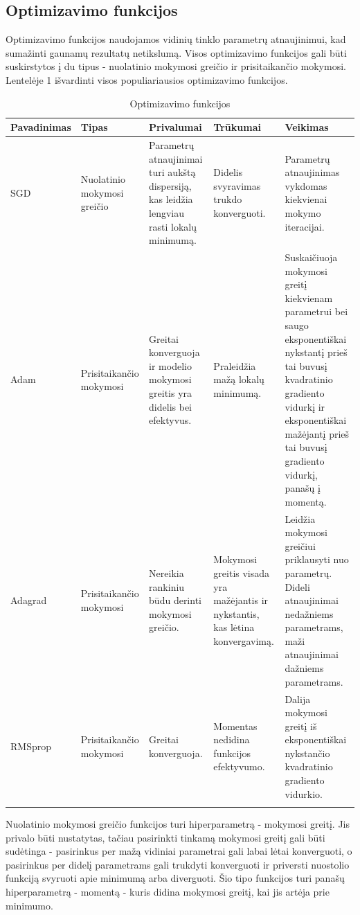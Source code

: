\documentclass{VUMIFPSkursinis}
\begin{document}
\subsection{Optimizavimo funkcijos}
Optimizavimo funkcijos naudojamos vidinių tinklo parametrų atnaujinimui, kad sumažinti gaunamų rezultatų netikslumą. 
Visos optimizavimo funkcijos gali būti suskirstytos į du tipus - nuolatinio mokymosi greičio ir prisitaikančio mokymosi. 
Lentelėje 1 išvardinti visos populiariausios optimizavimo funkcijos.

\begin{longtable}[h!]{ | p{2cm} | p{2.2cm} | p{2.5cm} | p{2.5cm} | p{4.5cm} | } 
\hline
Pavadinimas & Tipas & Privalumai & Trūkumai & Veikimas \\
\hline
SGD & Nuolatinio mokymosi greičio & Parametrų atnaujinimai turi aukštą dispersiją, kas leidžia lengviau rasti lokalų minimumą. & Didelis svyravimas trukdo konverguoti. & Parametrų atnaujinimas vykdomas kiekvienai mokymo iteracijai. \\
\hline
Adam & Prisitaikančio mokymosi & Greitai konverguoja ir modelio mokymosi greitis yra didelis bei efektyvus. & Praleidžia mažą lokalų minimumą. & Suskaičiuoja mokymosi greitį kiekvienam parametrui bei saugo eksponentiškai nykstantį prieš tai buvusį kvadratinio gradiento vidurkį ir eksponentiškai mažėjantį prieš tai buvusį gradiento vidurkį, panašų į momentą. \\
\hline
Adagrad & Prisitaikančio mokymosi & Nereikia rankiniu būdu derinti mokymosi greičio. & Mokymosi greitis visada yra mažėjantis ir nykstantis, kas lėtina konvergavimą. & Leidžia mokymosi greičiui priklausyti nuo parametrų. Dideli atnaujinimai nedažniems parametrams, maži atnaujinimai dažniems parametrams. \\
\hline
RMSprop & Prisitaikančio mokymosi & Greitai konverguoja. & Momentas nedidina funkcijos efektyvumo. & Dalija mokymosi greitį iš eksponentiškai nykstančio kvadratinio gradiento vidurkio. \\
\hline
\caption{Optimizavimo funkcijos}
\end{longtable}

Nuolatinio mokymosi greičio funkcijos turi hiperparametrą - mokymosi greitį. Jis privalo būti nustatytas, tačiau 
pasirinkti tinkamą mokymosi greitį gali būti sudėtinga - pasirinkus per mažą vidiniai parametrai gali labai lėtai 
konverguoti, o pasirinkus per didelį parametrams gali trukdyti konverguoti ir priversti nuostolio funkciją svyruoti
apie minimumą arba diverguoti. Šio tipo funkcijos turi panašų hiperparametrą - momentą - kuris didina mokymosi greitį, 
kai jis artėja prie minimumo. 
\end{document}
